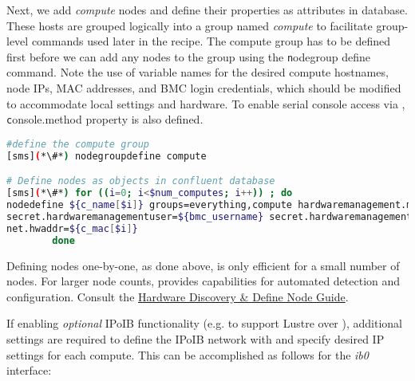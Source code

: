 
\noindent Next, we add {\em compute} nodes and define their properties as
attributes in \Confluent{} database.
These hosts are grouped logically into a group named {\em
compute} to facilitate group-level commands used later in the recipe. The compute
group has to be defined first before we can add any nodes to the group using the 
{\texttt nodegroup define} command. Note the
use of variable names for the desired compute hostnames, node IPs, MAC
addresses, and BMC login credentials, which should be modified to accommodate
local settings and hardware. To enable serial console access via  \Confluent{},
{\texttt console.method}
property is also defined. 

\begin{lstlisting}[language=bash,keywords={},upquote=true,basicstyle=\footnotesize\ttfamily,]
#define the compute group
[sms](*\#*) nodegroupdefine compute

# Define nodes as objects in confluent database
[sms](*\#*) for ((i=0; i<$num_computes; i++)) ; do
nodedefine ${c_name[$i]} groups=everything,compute hardwaremanagement.manager=${c_bmc[$i]} \ 
secret.hardwaremanagementuser=${bmc_username} secret.hardwaremanagementpassword=${bmc_password} \ 
net.hwaddr=${c_mac[$i]}
        done
\end{lstlisting}

\begin{center}
  \begin{tcolorbox}[]
    \small
Defining nodes one-by-one, as done above, is only efficient
for a small number of nodes. For larger node counts,
\Confluent{} provides capabilities for automated detection and
configuration.
Consult the
\href{https://hpc.lenovo.com/users/documentation/confluentdisco.html}{\color{blue}\Confluent{}
Hardware Discovery \& Define Node Guide}.
\end{tcolorbox}
\end{center}

If enabling {\em optional} IPoIB functionality (e.g. to support Lustre over \InfiniBand{}), additional
settings are required to define the IPoIB network with \Confluent{} and specify
desired IP settings for each compute. This can be accomplished as follows for
the {\em ib0} interface:

